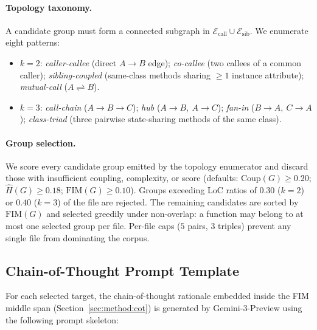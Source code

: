 \paragraph{Topology taxonomy.}
A candidate group must form a connected subgraph in
$\mathcal{E}_{\mathrm{call}} \cup \mathcal{E}_{\mathrm{sib}}$. We
enumerate eight patterns:
%
\begin{itemize}\setlength\itemsep{0.1em}
  \item \emph{$k=2$}: \emph{caller-callee} (direct $A\!\to\!B$ edge);
  \emph{co-callee} (two callees of a common caller); \emph{sibling-coupled}
  (same-class methods sharing $\geq 1$ instance attribute);
  \emph{mutual-call} ($A\!\rightleftharpoons\!B$).
  \item \emph{$k=3$}: \emph{call-chain} ($A\!\to\!B\!\to\!C$); \emph{hub}
  ($A\!\to\!B,\ A\!\to\!C$); \emph{fan-in} ($B\!\to\!A,\ C\!\to\!A$);
  \emph{class-triad} (three pairwise state-sharing methods of the same
  class).
\end{itemize}

\paragraph{Group selection.}
We score every candidate group emitted by the topology enumerator and
discard those with insufficient coupling, complexity, or score (defaults:
$\mathrm{Coup}(G) \ge 0.20$; $\hat{H}(G) \ge 0.18$;
$\mathrm{FIM}(G) \ge 0.10$). Groups exceeding LoC ratios of $0.30$ ($k=2$)
or $0.40$ ($k=3$) of the file are rejected. The remaining candidates are
sorted by $\mathrm{FIM}(G)$ and selected greedily under non-overlap: a
function may belong to at most one selected group per file. Per-file caps
($5$ pairs, $3$ triples) prevent any single file from dominating the
corpus.

\subsection{Chain-of-Thought Prompt Template}
\label{app:algo:cot}

For each selected target, the chain-of-thought rationale embedded inside
the FIM middle span (Section~\ref{sec:method:cot}) is generated by
Gemini-3-Preview using the following prompt skeleton:

